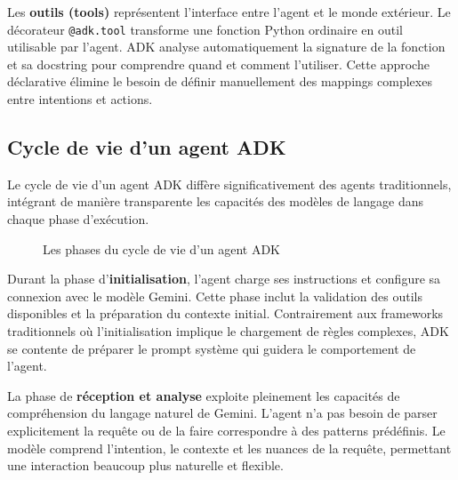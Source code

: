 Les \textbf{outils (tools)} représentent l'interface entre l'agent et le monde extérieur. Le décorateur \texttt{@adk.tool} transforme une fonction Python ordinaire en outil utilisable par l'agent. ADK analyse automatiquement la signature de la fonction et sa docstring pour comprendre quand et comment l'utiliser. Cette approche déclarative élimine le besoin de définir manuellement des mappings complexes entre intentions et actions.

\subsection{Cycle de vie d'un agent ADK}

Le cycle de vie d'un agent ADK diffère significativement des agents traditionnels, intégrant de manière transparente les capacités des modèles de langage dans chaque phase d'exécution.

\begin{figure}[h]
\centering
{}
\caption{Les phases du cycle de vie d'un agent ADK}
\end{figure}

Durant la phase d'\textbf{initialisation}, l'agent charge ses instructions et configure sa connexion avec le modèle Gemini. Cette phase inclut la validation des outils disponibles et la préparation du contexte initial. Contrairement aux frameworks traditionnels où l'initialisation implique le chargement de règles complexes, ADK se contente de préparer le prompt système qui guidera le comportement de l'agent.

La phase de \textbf{réception et analyse} exploite pleinement les capacités de compréhension du langage naturel de Gemini. L'agent n'a pas besoin de parser explicitement la requête ou de la faire correspondre à des patterns prédéfinis. Le modèle comprend l'intention, le contexte et les nuances de la requête, permettant une interaction beaucoup plus naturelle et flexible.

